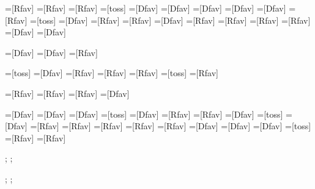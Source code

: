 

=[Rfav]	%
=[Rfav]	%
=[Rfav]	%
=[toss]	%
=[Dfav]	%
=[Dfav]	%
=[Dfav]	%
=[Dfav]	%
=[Dfav]	%
=[Rfav]	%
=[toss]	%
=[Dfav]	%
=[Rfav]	%
=[Rfav]	%
=[Dfav]	%
=[Rfav]	%
=[Rfav]	%
=[Rfav]	%
=[Rfav]	%
=[Dfav]	%
=[Dfav]	%

=[Dfav]	%
=[Dfav]	%
=[Rfav]	%

=[toss]	%
=[Dfav]	%
=[Rfav]	%
=[Rfav]	%
=[Rfav]	%
=[toss]	%
=[Rfav]	%

=[Rfav]	%
=[Rfav]	%
=[Rfav]	%
=[Dfav]	%

=[Dfav]	%
=[Dfav]	%
=[Dfav]	%
=[toss]	%
=[Dfav]	%
=[Rfav]	%
=[Rfav]	%
=[Dfav]	%
=[toss]	%
=[Dfav]	%
=[Rfav]	%
=[Rfav]	%
=[Rfav]	%
=[Rfav]	%
=[Rfav]	%
=[Dfav]	%
=[Dfav]	%
=[Dfav]	%
=[toss]	%
=[Rfav]	%
=[Rfav]	%




\def\Dfavcount{226};
\def\Rfavcount{219};

\def\Dwincount{0};
\def\Rwincount{0};
